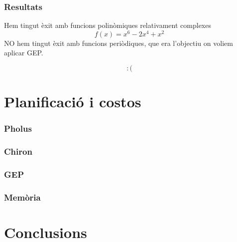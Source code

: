 \documentclass{beamer}
\begin{document}
\begin{frame}
	\frametitle{Resultats}
	Hem tingut èxit amb funcions polinòmiques relativament complexes
	$$ f(x) = x^6 -2x^4 + x^2 $$
	\pause
	NO hem tingut èxit amb funcions periòdiques, que era l'objectiu on voliem
	aplicar GEP.

	$$ :( $$
\end{frame}

\section{Planificació i costos} %
\label{sec:Planificacio i costos}

\begin{frame}
	\frametitle{Pholus}
\end{frame}

\begin{frame}
	\frametitle{Chiron}
\end{frame}

\begin{frame}
	\frametitle{GEP}
\end{frame}

\begin{frame}
	\frametitle{Memòria}
\end{frame}






\section{Conclusions} %
\label{sec:Conclusions}
\begin{frame}
\end{frame}


\end{document}
